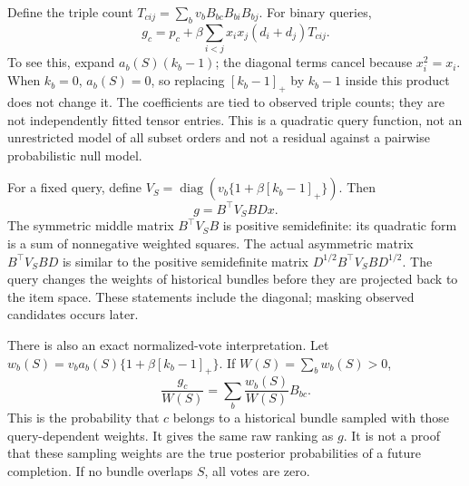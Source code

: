 \documentclass[11pt,a4paper]{article}
\newcommand{\diag}{\operatorname{diag}}
\begin{document}
Define the triple count $T_{cij}=\sum_bv_bB_{bc}B_{bi}B_{bj}$. For binary queries,
\begin{equation}\label{triple}
 g_c=p_c+\beta\sum_{i<j}x_ix_j(d_i+d_j)T_{cij}.
\end{equation}
To see this, expand $a_b(S)(k_b-1)$; the diagonal terms cancel because $x_i^2=x_i$.
When $k_b=0$, $a_b(S)=0$, so replacing $[k_b-1]_+$ by $k_b-1$ inside this product
does not change it. The coefficients are tied to observed triple counts; they
are not independently fitted tensor entries. This is a quadratic query function,
not an unrestricted model of all subset orders and not a residual against a
pairwise probabilistic null model.

For a fixed query, define
$V_S=\diag(v_b\{1+\beta[k_b-1]_+\})$. Then
\begin{equation}
 g=B^\top V_SB Dx.
\end{equation}
The symmetric middle matrix $B^\top V_SB$ is positive semidefinite: its quadratic
form is a sum of nonnegative weighted squares. The actual asymmetric matrix
$B^\top V_SBD$ is similar to the positive semidefinite matrix
$D^{1/2}B^\top V_SBD^{1/2}$. The query changes the weights of historical bundles
before they are projected back to the item space. These statements include the
diagonal; masking observed candidates occurs later.

There is also an exact normalized-vote interpretation. Let
$w_b(S)=v_ba_b(S)\{1+\beta[k_b-1]_+\}$. If $W(S)=\sum_bw_b(S)>0$,
\begin{equation}
 \frac{g_c}{W(S)}=\sum_b\frac{w_b(S)}{W(S)}B_{bc}.
\end{equation}
This is the probability that $c$ belongs to a historical bundle sampled with those
query-dependent weights. It gives the same raw ranking as $g$. It is not a proof
that these sampling weights are the true posterior probabilities of a future
completion. If no bundle overlaps $S$, all votes are zero.
\end{document}
